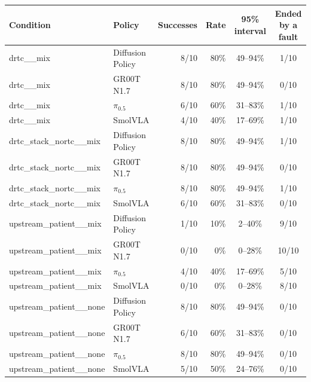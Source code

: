 \begin{tabular}{l l r r c c}
\toprule
Condition & Policy & Successes & Rate & 95\% interval & Ended by a fault \\
\midrule
drtc\_\_mix & Diffusion Policy & 8/10 & 80\% & 49--94\% & 1/10 \\
drtc\_\_mix & GR00T N1.7 & 8/10 & 80\% & 49--94\% & 0/10 \\
drtc\_\_mix & $\pi_{0.5}$ & 6/10 & 60\% & 31--83\% & 1/10 \\
drtc\_\_mix & SmolVLA & 4/10 & 40\% & 17--69\% & 1/10 \\
drtc\_stack\_nortc\_\_mix & Diffusion Policy & 8/10 & 80\% & 49--94\% & 1/10 \\
drtc\_stack\_nortc\_\_mix & GR00T N1.7 & 8/10 & 80\% & 49--94\% & 0/10 \\
drtc\_stack\_nortc\_\_mix & $\pi_{0.5}$ & 8/10 & 80\% & 49--94\% & 1/10 \\
drtc\_stack\_nortc\_\_mix & SmolVLA & 6/10 & 60\% & 31--83\% & 0/10 \\
upstream\_patient\_\_mix & Diffusion Policy & 1/10 & 10\% & 2--40\% & 9/10 \\
upstream\_patient\_\_mix & GR00T N1.7 & 0/10 & 0\% & 0--28\% & 10/10 \\
upstream\_patient\_\_mix & $\pi_{0.5}$ & 4/10 & 40\% & 17--69\% & 5/10 \\
upstream\_patient\_\_mix & SmolVLA & 0/10 & 0\% & 0--28\% & 8/10 \\
upstream\_patient\_\_none & Diffusion Policy & 8/10 & 80\% & 49--94\% & 0/10 \\
upstream\_patient\_\_none & GR00T N1.7 & 6/10 & 60\% & 31--83\% & 0/10 \\
upstream\_patient\_\_none & $\pi_{0.5}$ & 8/10 & 80\% & 49--94\% & 0/10 \\
upstream\_patient\_\_none & SmolVLA & 5/10 & 50\% & 24--76\% & 0/10 \\
\bottomrule
\end{tabular}
